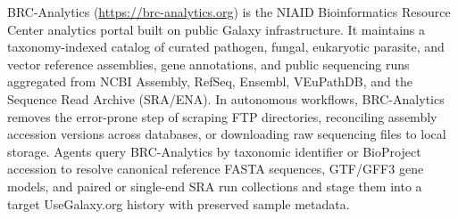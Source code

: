 \documentclass[11pt,letterpaper]{article}
\begin{document}
BRC-Analytics (\url{https://brc-analytics.org}) \cite{brcanalytics2026} is the NIAID Bioinformatics Resource Center analytics portal built on public Galaxy infrastructure. It maintains a taxonomy-indexed catalog of curated pathogen, fungal, eukaryotic parasite, and vector reference assemblies, gene annotations, and public sequencing runs aggregated from NCBI Assembly, RefSeq, Ensembl, VEuPathDB, and the Sequence Read Archive (SRA/ENA). In autonomous workflows, BRC-Analytics removes the error-prone step of scraping FTP directories, reconciling assembly accession versions across databases, or downloading raw sequencing files to local storage. Agents query BRC-Analytics by taxonomic identifier or BioProject accession to resolve canonical reference FASTA sequences, GTF/GFF3 gene models, and paired or single-end SRA run collections and stage them into a target UseGalaxy.org history with preserved sample metadata.
\end{document}
